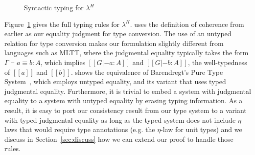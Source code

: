 \documentclass[acmsmall]{acmart}
\newcommand{\lang}{$\lambda^H$\xspace}
\begin{document}

\begin{figure}[ht]
\begin{minipage}{0.9\textwidth}
\end{minipage}
\caption{Syntactic typing for \lang}
\label{fig:typing}
\end{figure}

Figure~\ref{fig:typing} gives the full typing rules for
\lang{}.  uses the definition of coherence from earlier
as our equality judgment for type conversion. The use of an untyped
relation for type conversion makes our formulation slightly different
from languages such as MLTT, where the judgmental equality typically
takes the form $\Gamma \vdash a \equiv b : A$, which implies $[[G |- a :
A]]$ and $[[G |- b : A]]$, the well-typedness of $[[a]]$ and $[[b]]$.
\citet{siles2012pure} shows the equivalence of Barendregt's
Pure Type System~\citep{barendregt1991introduction}, which employs
untyped equality, and its variant that uses typed judgmental
equality. Furthermore, it is trivial to embed a system with judgmental
equality to a system with untyped equality by erasing typing
information. As a result, it is easy to port our consistency result from our
type system to a variant with typed judgmental equality
as long as the typed system does not include $\eta$ laws
that would require type annotations (e.g. the $\eta$-law for unit
types) and we discuss in Section~\ref{sec:discuss} how we can extend
our proof to handle those rules.
\end{document}
